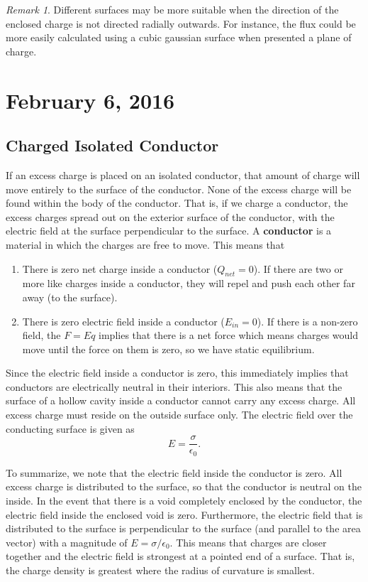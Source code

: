 \documentclass[11pt]{article}
\theoremstyle{plain} %
\theoremstyle{definition}
\theoremstyle{example}
\theoremstyle{remark}
\newtheorem*{remark}{Remark}
\begin{document}
\begin{remark}
Different surfaces may be more suitable when the direction of the enclosed charge is not directed radially outwards. For instance, the flux could be more easily calculated using a cubic gaussian surface when presented a plane of charge. 
\end{remark}




\section{February 6, 2016}
\subsection{Charged Isolated Conductor}

If an excess charge is placed on an isolated conductor, that amount of charge will move entirely to the surface of the conductor. None of the excess charge will be found within the body of the conductor. That is, if we charge a conductor, the excess charges spread out on the exterior surface of the conductor, with the electric field at the surface perpendicular to the surface. A \textbf{conductor} is a material in which the charges are free to move. This means that
\begin{enumerate}
\item There is zero net charge inside a conductor ($Q_{net} = 0$). If there are two or more like charges inside a conductor, they will repel and push each other far away (to the surface).
\item There is zero electric field inside a conductor ($E_{in} = 0$). If there is a non-zero field, the $F=Eq$ implies that there is a net force which means charges would move until the force on them is zero, so we have static equilibrium. 
\end{enumerate}

Since the electric field inside a conductor is zero, this immediately implies that conductors are electrically neutral in their interiors. This also means that the surface of a hollow cavity inside a conductor cannot carry any excess charge. All excess charge must reside on the outside surface only. The electric field over the conducting surface is given as 
$$E = \frac{\sigma}{\epsilon_0}.$$

To summarize, we note that the electric field inside the conductor is zero. All excess charge is distributed to the surface, so that the conductor is neutral on the inside. In the event that there is a void completely enclosed by the conductor, the electric field inside the enclosed void is zero. Furthermore, the electric field that is distributed to the surface is perpendicular to the surface (and parallel to the area vector) with a magnitude of $E = \sigma / \epsilon_0$. This means that charges are closer together and the electric field is strongest at a pointed end of a surface. That is, the charge density is greatest where the radius of curvature is smallest. 
\end{document}
